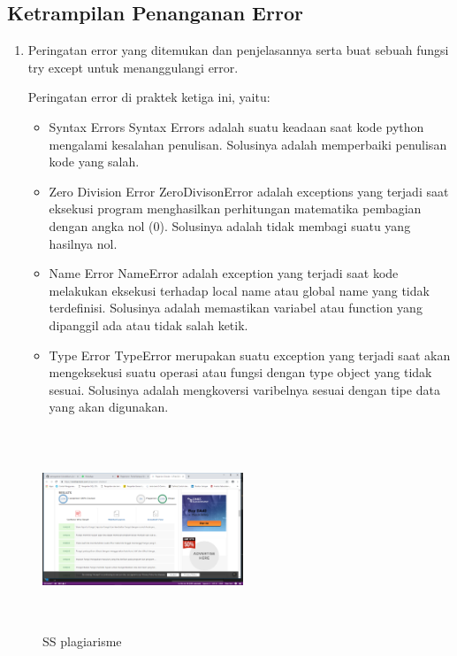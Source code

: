 \subsection{Ketrampilan Penanganan Error}
\begin{enumerate}
	\item Peringatan error yang ditemukan dan penjelasannya serta buat sebuah fungsi try except untuk menanggulangi error.
	
	Peringatan error di praktek ketiga ini, yaitu:
	\begin{itemize}
		\item Syntax Errors
		Syntax Errors adalah suatu keadaan saat kode python mengalami kesalahan penulisan. Solusinya adalah memperbaiki penulisan kode yang salah.
		
		\item Zero Division Error
		ZeroDivisonError adalah exceptions yang terjadi saat eksekusi program menghasilkan perhitungan matematika pembagian dengan angka nol (0). Solusinya adalah tidak membagi suatu yang hasilnya nol.
		
		\item Name Error
		NameError adalah exception yang terjadi saat kode melakukan eksekusi terhadap local name atau global name yang tidak terdefinisi. Solusinya adalah memastikan variabel atau function yang dipanggil ada atau tidak salah ketik.
		
		\item Type Error
		TypeError merupakan suatu exception yang terjadi saat akan mengeksekusi suatu operasi atau fungsi dengan type object yang tidak sesuai. Solusinya adalah mengkoversi varibelnya sesuai dengan tipe data yang akan digunakan.
	\end{itemize}
   \end{enumerate}

   \begin{figure}
   \centering
   \includegraphics[width=6cm,height=6cm]{figures/damaraa.png}
   \caption{SS plagiarisme}
   \label{damara}
   \end{figure}